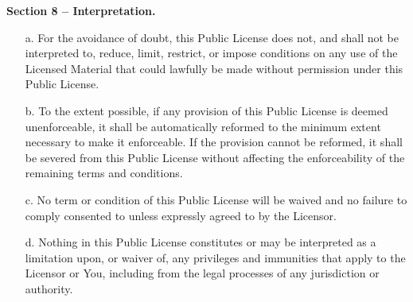 \begin{center}
    \textbf{Section 8 -- Interpretation.}
\end{center}

\begin{itemize}
    \item[a.] For the avoidance of doubt, this Public License does not, and shall not be interpreted to, reduce, limit, restrict, or impose conditions on any use of the Licensed Material that could lawfully be made without permission under this Public License.

    \item[b.] To the extent possible, if any provision of this Public License is deemed unenforceable, it shall be automatically reformed to the minimum extent necessary to make it enforceable. If the provision cannot be reformed, it shall be severed from this Public License without affecting the enforceability of the remaining terms and conditions.

    \item[c.] No term or condition of this Public License will be waived and no failure to comply consented to unless expressly agreed to by the Licensor.

    \item[d.] Nothing in this Public License constitutes or may be interpreted as a limitation upon, or waiver of, any privileges and immunities that apply to the Licensor or You, including from the legal processes of any jurisdiction or authority.
\end{itemize}



